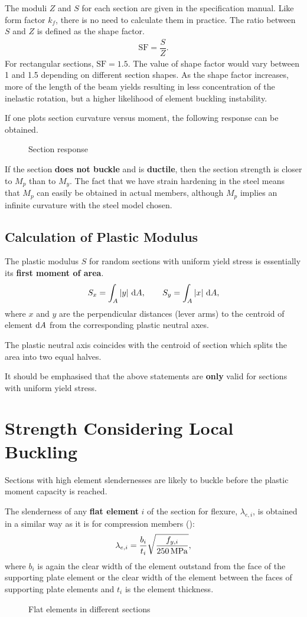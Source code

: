 The moduli $Z$ and $S$ for each section are given in the specification manual. Like form factor $k_f$, there is no need to calculate them in practice. The ratio between $S$ and $Z$ is defined as the shape factor.
\begin{gather*}
\mathrm{SF}=\dfrac{S}{Z}.
\end{gather*}
For rectangular sections, $\mathrm{SF}=1.5$. The value of shape factor would vary between \num{1} and \num{1.5} depending on different section shapes. As the shape factor increases, more of the length of the beam yields resulting in less concentration of the inelastic rotation, but a higher likelihood of element buckling instability.

If one plots section curvature versus moment, the following response can be obtained.
\begin{figure}[H]
\centering
\caption{Section response}
\end{figure}
If the section \textbf{does not buckle} and is \textbf{ductile}, then the section strength is closer to $M_p$ than to $M_y$. The fact that we have strain hardening in the steel means that $M_p$ can easily be obtained in actual members, although $M_p$ implies an infinite curvature with the steel model chosen.
\subsection{Calculation of Plastic Modulus}
The plastic modulus $S$ for random sections with uniform yield stress is essentially its \textbf{first moment of area}.
\begin{gather*}
S_x=\int_A|y|~\mathrm{d}A,\qquad
S_y=\int_A|x|~\mathrm{d}A,
\end{gather*}
where $x$ and $y$ are the perpendicular distances (lever arms) to the centroid of element $\mathrm{d}A$ from the corresponding plastic neutral axes.

The plastic neutral axis coincides with the centroid of section which splits the area into two equal halves.

It should be emphasised that the above statements are \textbf{only} valid for sections with uniform yield stress.
\section{Strength Considering Local Buckling}
Sections with high element slendernesses are likely to buckle before the plastic moment capacity is reached.

The slenderness of any \textbf{flat element} $i$ of the section for flexure, $\lambda_{e,i}$, is obtained in a similar way as it is for compression members ():
\begin{gather*}
\lambda_{e,i}=\dfrac{b_i}{t_i}\sqrt{\dfrac{f_{y,i}}{\SI{250}{\mega\pascal}}},
\end{gather*}
where $b_i$ is again the clear width of the element outstand from the face of the supporting plate element or the clear width of the element between the faces of supporting plate elements and $t_i$ is the element thickness.
\begin{figure}[H]
\centering

\caption{Flat elements in different sections}
\end{figure}

